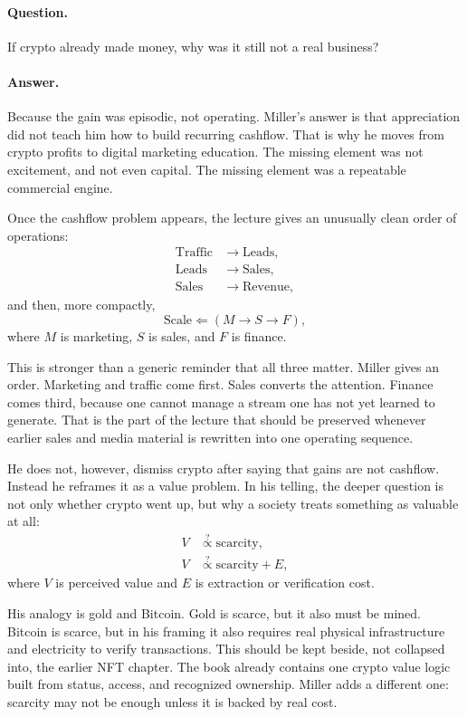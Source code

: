 \documentclass[11pt,oneside]{book}
\begin{document}
\paragraph{Question.}
If crypto already made money, why was it still not a real business?

\paragraph{Answer.}
Because the gain was episodic, not operating. Miller's answer is that appreciation did not teach him how to build recurring cashflow. That is why he moves from crypto profits to digital marketing education. The missing element was not excitement, and not even capital. The missing element was a repeatable commercial engine.

Once the cashflow problem appears, the lecture gives an unusually clean order of operations:
\begin{align}
\text{Traffic} &\to \text{Leads},\\
\text{Leads} &\to \text{Sales},\\
\text{Sales} &\to \text{Revenue},
\end{align}
and then, more compactly,
\[
\text{Scale} \Leftarrow (M \to S \to F),
\]
where \(M\) is marketing, \(S\) is sales, and \(F\) is finance.

This is stronger than a generic reminder that all three matter. Miller gives an order. Marketing and traffic come first. Sales converts the attention. Finance comes third, because one cannot manage a stream one has not yet learned to generate. That is the part of the lecture that should be preserved whenever earlier sales and media material is rewritten into one operating sequence.

He does not, however, dismiss crypto after saying that gains are not cashflow. Instead he reframes it as a value problem. In his telling, the deeper question is not only whether crypto went up, but why a society treats something as valuable at all:
\begin{align}
V &\stackrel{?}{\propto} \text{scarcity},\\
V &\stackrel{?}{\propto} \text{scarcity}+E,
\end{align}
where \(V\) is perceived value and \(E\) is extraction or verification cost.

His analogy is gold and Bitcoin. Gold is scarce, but it also must be mined. Bitcoin is scarce, but in his framing it also requires real physical infrastructure and electricity to verify transactions. This should be kept beside, not collapsed into, the earlier NFT chapter. The book already contains one crypto value logic built from status, access, and recognized ownership. Miller adds a different one: scarcity may not be enough unless it is backed by real cost.
\end{document}
